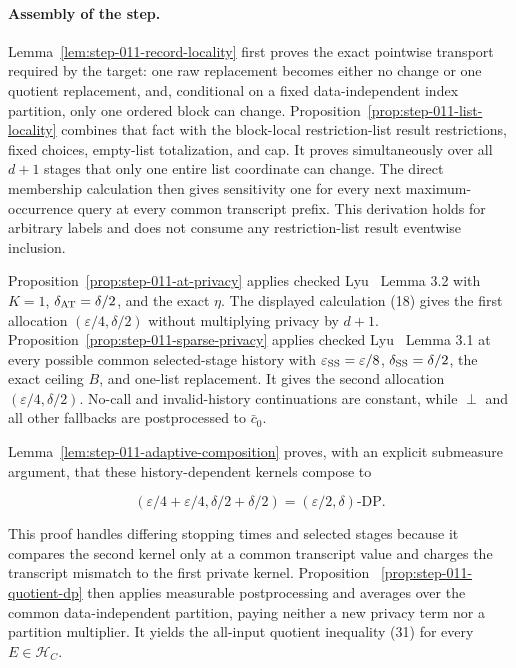 \paragraph{Assembly of the step.}


Lemma~\ref{lem:step-011-record-locality} first proves the exact pointwise
transport required by the target: one raw replacement becomes either no
change or one quotient replacement, and, conditional on a fixed
data-independent index partition, only one ordered block can change.
Proposition~\ref{prop:step-011-list-locality} combines that fact with the
 block-local restriction-list result restrictions, fixed choices, empty-list
totalization, and cap. It proves simultaneously over all \(d+1\) stages
that only one entire list coordinate can change. The direct membership
calculation then gives sensitivity one for every next maximum-occurrence
query at every common transcript prefix. This derivation holds for arbitrary
labels and does not consume any restriction-list result eventwise inclusion.

Proposition~\ref{prop:step-011-at-privacy} applies checked Lyu~\citep{lyu2025} Lemma 3.2
with \(K=1\), \(\delta_{\rm AT}=\delta/2\), and the exact  \(\eta\).
The displayed calculation (18) gives the first allocation
\((\varepsilon/4,\delta/2)\) without multiplying privacy by \(d+1\).
Proposition~\ref{prop:step-011-sparse-privacy} applies checked Lyu~\citep{lyu2025} Lemma 3.1
at every possible common selected-stage history with
\(\varepsilon_{\rm SS}=\varepsilon/8\),
\(\delta_{\rm SS}=\delta/2\), the exact ceiling \(B\), and one-list
replacement. It gives the second allocation
\((\varepsilon/4,\delta/2)\). No-call and invalid-history continuations are
constant, while \(\perp\) and all other fallbacks are postprocessed to
\(\bar c_0\).

Lemma~\ref{lem:step-011-adaptive-composition} proves, with an explicit
submeasure argument, that these history-dependent kernels compose to

\[
 (\varepsilon/4+\varepsilon/4,
   \delta/2+\delta/2)
 =(\varepsilon/2,\delta)\text{-DP}.
\]

This proof handles differing stopping times and selected stages because it
compares the second kernel only at a common transcript value and charges
the transcript mismatch to the first private kernel. Proposition
~\ref{prop:step-011-quotient-dp} then applies measurable postprocessing and
averages over the common data-independent partition, paying neither a new
privacy term nor a partition multiplier. It yields the all-input quotient
inequality (31) for every \(E\in\mathcal H_C\).


